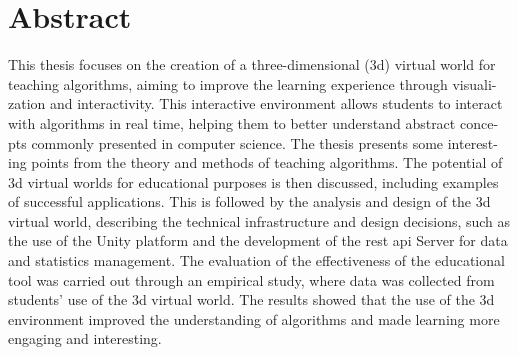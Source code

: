 \section*{Abstract}

This thesis focuses on the creation of a three-dimensional (\acrshort{3d}) virtual world for teaching algorithms, aiming to improve the learning experience through visuali-zation and interactivity. This interactive environment allows students to interact with algorithms in real time, helping them to better understand abstract conce-pts commonly presented in computer science. The thesis presents some interest-ing points from the  theory and methods of teaching algorithms. The potential of \acrshort{3d} virtual worlds for educational purposes is then discussed, including examples of successful applications. This is followed by the analysis and design of the \acrshort{3d} virtual world, describing the technical infrastructure and design decisions, such as the use of the Unity platform and the development of the \acrshort{rest} \acrshort{api} Server for data and statistics management. The evaluation of the effectiveness of the educational tool was carried out through an empirical study, where data was collected from students' use of the \acrshort{3d} virtual world. The results showed that the use of the \acrshort{3d} environment improved the understanding of algorithms and made learning more engaging and interesting.


\pagebreak
